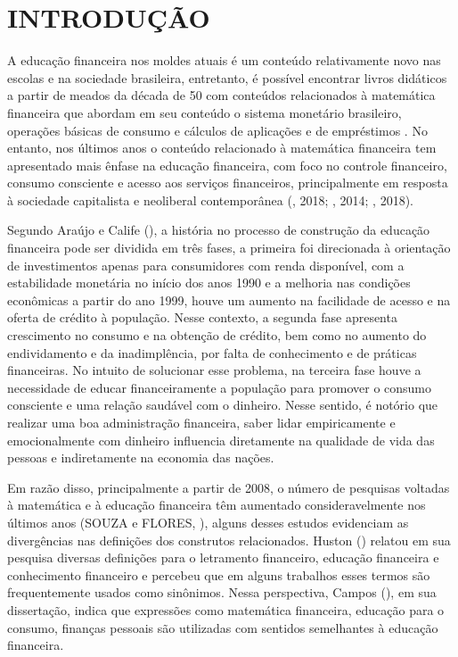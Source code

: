 




\textual
\chapter{INTRODUÇÃO}
A educação financeira nos moldes atuais é um conteúdo relativamente novo nas escolas e na sociedade brasileira, entretanto, é possível encontrar livros didáticos a partir de meados da década de 50 com conteúdos relacionados à matemática financeira que abordam em seu conteúdo o sistema monetário brasileiro, operações básicas de consumo e cálculos de aplicações e de empréstimos \cite{souza-flores2018}. No entanto, nos últimos anos o conteúdo relacionado à matemática financeira tem apresentado mais ênfase na educação financeira, com foco no controle financeiro, consumo consciente e acesso aos serviços financeiros, principalmente em resposta à sociedade capitalista e neoliberal contemporânea (\citeauthor{souza-flores2018}, 2018; \citeauthor{araujo-calife2014}, 2014; \citeauthor{cordeiro-costa-silva2018}, 2018).

Segundo Araújo e Calife (\citeyear{araujo-calife2014}), a história no processo de construção da educação financeira pode ser dividida em três fases, a primeira foi direcionada à orientação de investimentos apenas para consumidores com renda disponível, com a estabilidade monetária no início dos anos 1990 e a melhoria nas condições econômicas a partir do ano 1999, houve um aumento na facilidade de acesso e na oferta de crédito à população. Nesse contexto, a segunda fase apresenta crescimento no consumo e na obtenção de crédito, bem como no aumento do endividamento e da inadimplência, por falta de conhecimento e de práticas financeiras. No intuito de solucionar esse problema, na terceira fase houve a necessidade de educar financeiramente a população para promover o consumo consciente e uma relação saudável com o dinheiro. Nesse sentido, é notório que realizar uma boa administração financeira, saber lidar empiricamente e emocionalmente com dinheiro influencia diretamente na qualidade de vida das pessoas e indiretamente na economia das nações.

Em razão disso, principalmente a partir de 2008, o número de pesquisas voltadas à matemática e à educação financeira têm aumentado consideravelmente nos últimos anos (SOUZA e FLORES, \citeyear{souza-flores2018}), alguns desses estudos evidenciam as divergências nas definições dos construtos relacionados. Huston (\citeyear{huston2010}) relatou em sua pesquisa diversas definições para o letramento financeiro, educação financeira e conhecimento financeiro e percebeu que em alguns trabalhos esses termos são frequentemente usados como sinônimos. Nessa perspectiva, Campos (\citeyear{campos2013}), em sua dissertação, indica que expressões como matemática financeira, educação para o consumo, finanças pessoais são utilizadas com sentidos semelhantes à educação financeira.

